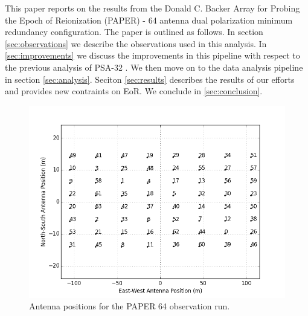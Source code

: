 \documentclass[twocolumn,numberedappendix]{emulateapj} \shorttitle{PSA64}
\begin{document}
This paper reports on the results from the Donald C. Backer Array for Probing
the Epoch of Reionization (PAPER) -  64 antenna dual polarization minimum
redundancy configuration.  The paper is outlined as follows. In section
\ref{sec:observations} we describe the observations used in this analysis. In
\ref{sec:improvements} we discuss the improvements in this pipeline with respect
to the previous analysis of PSA-32 \cite{parsons_et_al2014a}. We then move on to
the data analysis pipeline in section \ref{sec:analysis}. Seciton
\ref{sec:results} describes the results of our efforts and provides new
contraints on EoR. We conclude in \ref{sec:conclusion}.

\begin{figure}[!t]\centering
\includegraphics[width=1.85\columnwidth,height=\columnwidth]{plots/antenna_positions.png}
\caption{Antenna positions for the PAPER 64 observation run.}
\label{fig:antenna_positions}
\end{figure}



\end{document}
